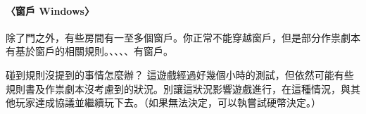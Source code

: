 \paragraph{〈窗戶 Windows〉}
除了門之外，有些房間有一至多個窗戶。你正常不能穿越窗戶，但是部分作祟劇本有基於窗戶的相關規則。、、、、有窗戶。

\begin{RuleBox}{碰到規則沒提到的事情怎麼辦？}
  這遊戲經過好幾個小時的測試，但依然可能有些規則書及作祟劇本沒考慮到的狀況。別讓這狀況影響遊戲進行，在這種情況，與其他玩家達成協議並繼續玩下去。（如果無法決定，可以執嘗試硬幣決定。）
\end{RuleBox}

